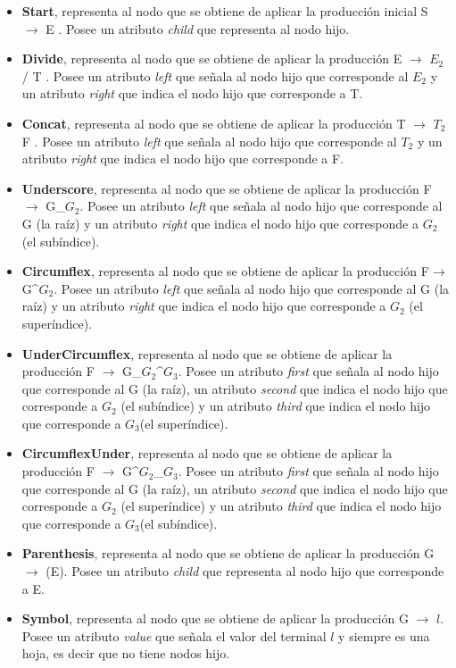 \begin{itemize}
\item \textbf{Start}, representa al nodo que se obtiene de aplicar la producción inicial  S $\rightarrow$ E . Posee un atributo \textit{child} que representa al nodo hijo.
\item \textbf{Divide}, representa al nodo que se obtiene de aplicar la producción E $\rightarrow$ $E_2$ / T . Posee un atributo \textit{left} que señala al nodo hijo que corresponde al $E_2$ y un atributo \textit{right} que indica el nodo hijo que corresponde a T.
\item \textbf{Concat}, representa al nodo que se obtiene de aplicar la producción T $\rightarrow$ $T_2$F . Posee un atributo \textit{left} que señala al nodo hijo que corresponde al $T_2$ y un atributo \textit{right} que indica el nodo hijo que corresponde a F.
\item \textbf{Underscore}, representa al nodo que se obtiene de aplicar la producción F$\rightarrow$ G\_$G_2$. Posee un atributo \textit{left} que señala al nodo hijo que corresponde al G (la raíz) y un atributo \textit{right} que indica el nodo hijo que corresponde a $G_2$ (el subíndice).
\item \textbf{Circumflex}, representa al nodo que se obtiene de aplicar la producción F$\rightarrow$ G\textasciicircum$G_2$. Posee un atributo \textit{left} que señala al nodo hijo que corresponde al G (la raíz) y un atributo \textit{right} que indica el nodo hijo que corresponde a $G_2$ (el superíndice).
\item \textbf{UnderCircumflex}, representa al nodo que se obtiene de aplicar la producción F $\rightarrow$ G\_$G_2$\textasciicircum $G_3$. Posee un atributo \textit{first} que señala al nodo hijo que corresponde al G (la raíz), un atributo \textit{second} que indica el nodo hijo que corresponde a $G_2$ (el subíndice) y un atributo \textit{third} que indica el nodo hijo que corresponde a $G_3$(el superíndice).
\item \textbf{CircumflexUnder}, representa al nodo que se obtiene de aplicar la producción F $\rightarrow$ G\textasciicircum $G_2$\_$G_3$. Posee un atributo \textit{first} que señala al nodo hijo que corresponde al G (la raíz), un atributo \textit{second} que indica el nodo hijo que corresponde a $G_2$ (el superíndice) y un atributo \textit{third} que indica el nodo hijo que corresponde a $G_3$(el subíndice).
\item \textbf{Parenthesis}, representa al nodo que se obtiene de aplicar la producción G $\rightarrow$ (E). Posee un atributo \textit{child} que representa al nodo hijo que corresponde a E.
\item \textbf{Symbol}, representa al nodo que se obtiene de aplicar la producción G $\rightarrow$ $l$. Posee un atributo \textit{value} que señala el valor del terminal $l$ y siempre es una hoja, es decir que no tiene nodos hijo.
\end{itemize}

